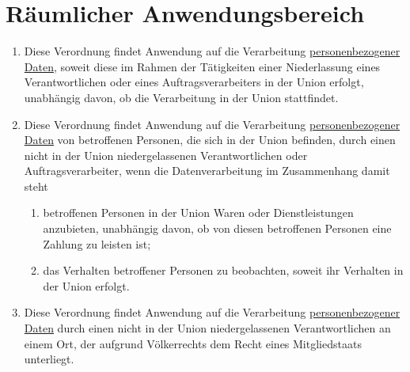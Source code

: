 \chapter{Räumlicher Anwendungsbereich}
\label{ch:3}


\begin{enumerate}

  \item Diese Verordnung findet Anwendung auf die Verarbeitung \hyperref[itm:04-1]{personenbezogener Daten}, soweit
   diese im Rahmen der Tätigkeiten einer Niederlassung eines Verantwortlichen oder eines Auftragsverarbeiters in der
   Union erfolgt, unabhängig davon, ob die Verarbeitung in der Union stattfindet.
  \label{itm:03-1}

  \item Diese Verordnung findet Anwendung auf die Verarbeitung \hyperref[itm:04-1]{personenbezogener Daten} von
   betroffenen Personen, die sich in der Union befinden, durch einen nicht in der Union niedergelassenen
   Verantwortlichen oder Auftragsverarbeiter, wenn die Datenverarbeitung im Zusammenhang damit steht
  \label{itm:03-2}

  \begin{enumerate}
  
    \item betroffenen Personen in der Union Waren oder Dienstleistungen anzubieten, unabhängig davon, ob von diesen
     betroffenen Personen eine Zahlung zu leisten ist;
    \label{itm:03-2a}

    \item das Verhalten betroffener Personen zu beobachten, soweit ihr Verhalten in der Union erfolgt.
    \label{itm:03-2b}

  \end{enumerate}

  \item Diese Verordnung findet Anwendung auf die Verarbeitung \hyperref[itm:04-1]{personenbezogener Daten} durch einen
   nicht in der Union niedergelassenen Verantwortlichen an einem Ort, der aufgrund Völkerrechts dem Recht eines
   Mitgliedstaats unterliegt.
  \label{itm:03-3}

\end{enumerate}


